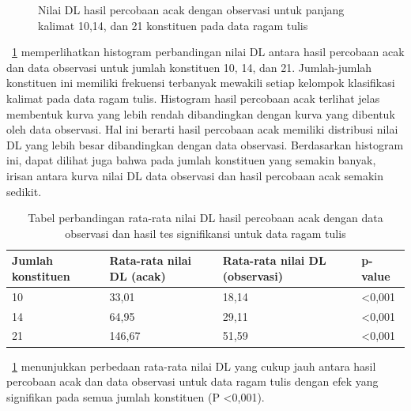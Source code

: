 \begin{figure}
\caption{Nilai DL hasil percobaan acak dengan observasi untuk panjang kalimat 10,14, dan 21 konstituen pada data ragam tulis}
\label{fig:trandomobs}
\end{figure}

\pic~\ref{fig:trandomobs} memperlihatkan histogram perbandingan nilai DL antara hasil percobaan acak dan data observasi untuk jumlah konstituen 10, 14, dan 21. Jumlah-jumlah konstituen ini memiliki frekuensi terbanyak mewakili setiap kelompok klasifikasi kalimat pada data ragam tulis.  Histogram hasil percobaan acak terlihat jelas membentuk kurva yang lebih rendah dibandingkan dengan kurva yang dibentuk oleh data observasi. Hal ini berarti hasil percobaan acak memiliki distribusi nilai DL yang lebih besar dibandingkan dengan data observasi. Berdasarkan histogram ini, dapat dilihat juga bahwa pada jumlah konstituen yang semakin banyak, irisan antara kurva nilai DL data observasi dan hasil percobaan acak semakin sedikit.

\begin{table}
\begin{center}
\begin{small}
  \caption{Tabel perbandingan rata-rata nilai DL hasil percobaan acak dengan data observasi dan hasil tes signifikansi untuk data ragam tulis}  \label{tab:perbandingan_DL_tulis}
  \begin{tabular}{ | l | l | l | l |}
    \hline
    	Jumlah konstituen & Rata-rata nilai DL (acak) & Rata-rata nilai DL (observasi) & p-value \\ \hline
	10 & 33,01 & 18,14 & \textless 0,001 \\ \hline
	14 & 64,95 & 29,11 & \textless 0,001 \\ \hline
	21 & 146,67 & 51,59 & \textless 0,001 \\ \hline
  \end{tabular}
  \end{small}
\end{center}
\end{table}

\tab~\ref{tab:perbandingan_DL_tulis} menunjukkan perbedaan rata-rata nilai DL yang cukup jauh antara hasil percobaan acak dan data observasi untuk data ragam tulis dengan efek yang signifikan pada semua jumlah konstituen (P \textless 0,001). 

